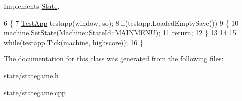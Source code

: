 Implements \hyperlink{classState_aa64fccff3427feb37d929cd5b327209c}{State}.


\begin{DoxyCode}
6 \{
7     \hyperlink{classTestApp}{TestApp} testapp(window, so);
8     \textcolor{keywordflow}{if}(testapp.LoadedEmptySave())
9     \{
10         machine.\hyperlink{classMachine_abe967397f2de76335bd90ab7aabd8f9f}{SetState}(\hyperlink{classMachine_a5fb0c119d231dd1bfe1dd2c9ca533520a3287971e79b4dca11067ed287847c1e6}{Machine::StateId::MAINMENU});
11         \textcolor{keywordflow}{return};
12     \}
13 
14 
15     \textcolor{keywordflow}{while}(testapp.Tick(machine, highscore));
16 \}
\end{DoxyCode}


The documentation for this class was generated from the following files\+:\begin{DoxyCompactItemize}
\item 
state/\hyperlink{stategame_8h}{stategame.\+h}\item 
state/\hyperlink{stategame_8cpp}{stategame.\+cpp}\end{DoxyCompactItemize}
